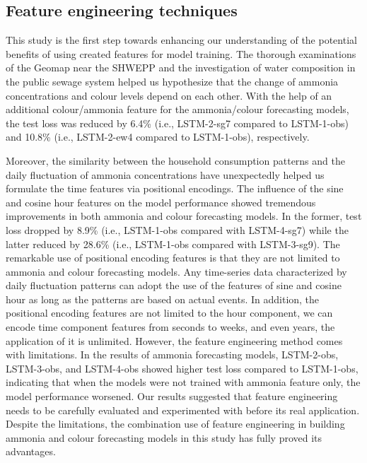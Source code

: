 
\subsection{Feature engineering techniques}
This study is the first step towards enhancing our understanding of the potential benefits of using created features for model training. The thorough examinations of the Geomap near the SHWEPP and the investigation of water composition in the public sewage system helped us hypothesize that the change of ammonia concentrations and colour levels depend on each other. With the help of an additional colour/ammonia feature for the ammonia/colour forecasting models, the test loss was reduced by 6.4\% (i.e., LSTM-2-sg7 compared to LSTM-1-obs) and 10.8\% (i.e., LSTM-2-ew4 compared to LSTM-1-obs), respectively.

Moreover, the similarity between the household consumption patterns and the daily fluctuation of ammonia concentrations have unexpectedly helped us formulate the time features via positional encodings. The influence of the sine and cosine hour features on the model performance showed tremendous improvements in both ammonia and colour forecasting models. In the former, test loss dropped by 8.9\% (i.e., LSTM-1-obs compared with LSTM-4-sg7) while the latter reduced by 28.6\% (i.e., LSTM-1-obs compared with LSTM-3-sg9). The remarkable use of positional encoding features is that they are not limited to ammonia and colour forecasting models. Any time-series data characterized by daily fluctuation patterns can adopt the use of the features of sine and cosine hour as long as the patterns are based on actual events. In addition, the positional encoding features are not limited to the hour component, we can encode time component features from seconds to weeks, and even years, the application of it is unlimited. However, the feature engineering method comes with limitations. In the results of ammonia forecasting models, LSTM-2-obs, LSTM-3-obs, and LSTM-4-obs showed higher test loss compared to LSTM-1-obs, indicating that when the models were not trained with ammonia feature only, the model performance worsened. Our results suggested that feature engineering needs to be carefully evaluated and experimented with before its real application. Despite the limitations, the combination use of feature engineering in building ammonia and colour forecasting models in this study has fully proved its advantages.

